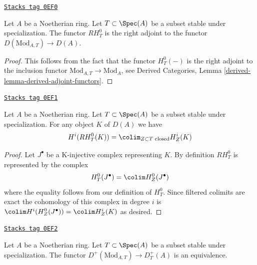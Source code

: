 \begin{lemma}[Adjoint]
\label{local-cohomology-lemma-adjoint}
\href{https://stacks.math.columbia.edu/tag/0EF0}{\texttt{Stacks tag 0EF0}}

Let $A$ be a Noetherian ring. Let $T \subset \Spec(A)$
be a subset stable under specialization. The functor
$RH^0_T$ is the right adjoint to the functor
$D(\text{Mod}_{A, T}) \to D(A)$.
\end{lemma}

\begin{proof}
This follows from the fact that the functor $H^0_T(-)$ is
the right adjoint to the inclusion functor
$\text{Mod}_{A, T} \to \text{Mod}_A$, see
Derived Categories, Lemma \ref{derived-lemma-derived-adjoint-functors}.
\end{proof}

\begin{lemma}
\label{local-cohomology-lemma-adjoint-ext}
\href{https://stacks.math.columbia.edu/tag/0EF1}{\texttt{Stacks tag 0EF1}}

Let $A$ be a Noetherian ring. Let $T \subset \Spec(A)$
be a subset stable under specialization.
For any object $K$ of $D(A)$ we have
$$
H^i(RH^0_T(K)) = \colim_{Z \subset T\text{ closed}} H^i_Z(K)
$$
\end{lemma}

\begin{proof}
Let $J^\bullet$ be a K-injective complex representing $K$.
By definition $RH^0_T$ is represented by the complex
$$
H^0_T(J^\bullet) = \colim H^0_Z(J^\bullet)
$$
where the equality follows from our definition of $H^0_T$.
Since filtered colimits are exact the cohomology of this
complex in degree $i$ is
$\colim H^i(H^0_Z(J^\bullet)) = \colim H^i_Z(K)$
as desired.
\end{proof}

\begin{lemma}
\label{local-cohomology-lemma-equal-plus}
\href{https://stacks.math.columbia.edu/tag/0EF2}{\texttt{Stacks tag 0EF2}}

Let $A$ be a Noetherian ring. Let $T \subset \Spec(A)$ be a subset stable
under specialization. The functor $D^+(\text{Mod}_{A, T}) \to D^+_T(A)$
is an equivalence.
\end{lemma}

